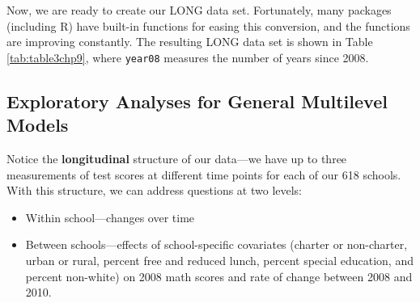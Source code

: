 \documentclass[
]{krantz}
\providecommand{\tightlist}{%
  \setlength{\itemsep}{0pt}\setlength{\parskip}{0pt}}
\begin{document}
Now, we are ready to create our LONG data set. Fortunately, many packages (including R) have built-in functions for easing this conversion, and the functions are improving constantly. The resulting LONG data set is shown in Table \ref{tab:table3chp9}, where \texttt{year08} measures the number of years since 2008.



\begin{table}
\centering
\caption{\label{tab:table3chp9}The first six observations in the long data set for the Charter Schools case study; these lines correspond to the first two observations from the wide data set illustrated in Table \ref{tab:table1chp9}.}
\centering
{}
\end{table}

\subsection{Exploratory Analyses for General Multilevel Models}\label{generalanalyses}

Notice the \textbf{longitudinal}  structure of our data---we have up to three measurements of test scores at different time points for each of our 618 schools. With this structure, we can address questions at two levels:

\begin{itemize}
\tightlist
\item
  Within school---changes over time
\item
  Between schools---effects of school-specific covariates (charter or non-charter, urban or rural, percent free and reduced lunch, percent special education, and percent non-white) on 2008 math scores and rate of change between 2008 and 2010.
\end{itemize}
\end{document}
